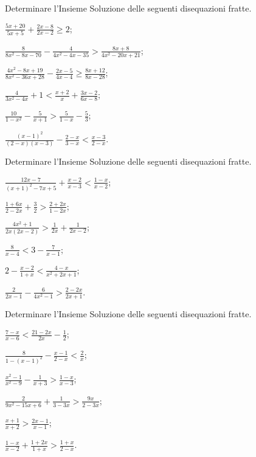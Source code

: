 \begin{esercizio}[\Ast]
 \label{ese:4.61}
Determinare l'Insieme Soluzione delle seguenti disequazioni fratte.
\begin{multicols}{2}
\begin{enumeratea}
\item $\frac{5x+20}{5x+5}+\frac{2x-8}{2x-2}\ge 2$;
\item $\frac 8{8x^2-8x-70}-\frac 4{4x^2-4x-35}>\frac{8x+8}{4x^2-20x+21}$;
\item $\frac{4x^2-8x+19}{8x^2-36x+28}-\frac{2x-5}{4x-4}\ge \frac{8x+12}{8x-28}$;
\item $\frac{4}{3x^{2}-4x}+1<\frac {x+2}{x}+\frac{3x-2}{6x-8}$;
\item $\frac{10}{1-x^{2}}-\frac{5}{x+1}>\frac{5}{1-x}-\frac{5}{3}$;
\item $\frac{(x-1)^2}{(2-x)(x-3)}-\frac{2-x}{3-x}<\frac{x-3}{2-x}$.
\end{enumeratea}
\end{multicols}
\end{esercizio}

\begin{esercizio}[\Ast]
 \label{ese:4.62}
Determinare l'Insieme Soluzione delle seguenti disequazioni fratte.
\begin{multicols}{2}
\begin{enumeratea}
\item $\frac{12x-7}{(x+1)^{2}-7x+5}+\frac{x-2}{x-3}<\frac{1-x}{x-2}$;
\item $\frac{1+6x}{2-2x}+\frac{3}{2}>\frac{2+2x}{1-2x}$;
\item $\frac{4x^2+1}{2x(2x-2)}>\frac{1}{2x}+\frac{1}{2x-2}$;
\item $\frac{8}{x-4}<3-\frac{7}{x-1}$;
\item $2-\frac{x-2}{1+x}<\frac{4-x}{x^{2}+2x+1}$;
\item $\frac{2}{2x-1}-\frac{6}{4x^{2}-1}>\frac{2-2x}{2x+1}$.
\end{enumeratea}
\end{multicols}
\end{esercizio}
\pagebreak
\begin{esercizio}[\Ast]
 \label{ese:4.63}
Determinare l'Insieme Soluzione delle seguenti disequazioni fratte.
\begin{multicols}{2}
\begin{enumeratea}
\item $\frac{7-x}{x-6}<\frac{21-2x}{2x}-\frac{1}{2}$;
\item $\frac{8}{1-(x-1)^{2}}-\frac{x-1}{2-x}<\frac{2}{x}$;
\item $\frac{x^2-1}{x^2-9}-\frac{1}{x+3}>\frac{1-x}{x-3}$;
\item $\frac{2}{9x^{2}-15x+6}+\frac{1}{3-3x}>\frac{9x}{2-3x}$;
\item $\frac{x+1}{x+2}>\frac{2x-1}{x-1}$;
\item $\frac{1-x}{x-2}+\frac{1+2x}{1+x}>\frac{1+x}{2-x}$.
\end{enumeratea}
\end{multicols}
\end{esercizio}

